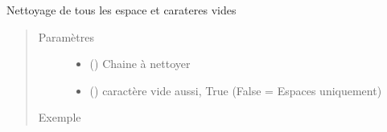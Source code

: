 \documentclass[letterpaper,10pt,french]{sphinxmanual}
\begin{document}
\begin{fulllineitems}
\label{\detokenize{modules/tools:toolbox.tools.clean_allspace}}
Nettoyage de tous les espace et carateres vides
\begin{quote}\begin{description}
\item[{Paramètres}] \leavevmode\begin{itemize}
\item {} 
 () \textendash{} Chaine à nettoyer

\item {} 
 () \textendash{} caractère vide aussi, True (False = Espaces uniquement)

\end{itemize}

\item[{Exemple}] \leavevmode
\begin{sphinxVerbatim}[commandchars=\\\{\}]
  
 
\end{sphinxVerbatim}

\end{description}\end{quote}

\end{fulllineitems}

\end{document}
